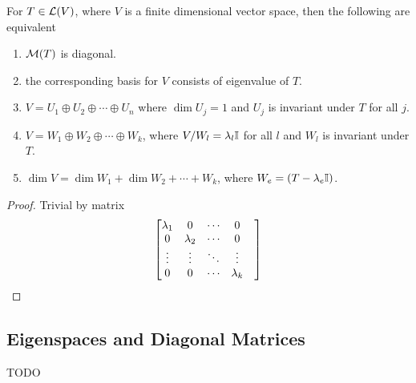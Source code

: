 \begin{theorem}
    For $T \in \mathcal L(V)$, where $V$ is a finite dimensional vector space, then the following are equivalent
    \begin{enumerate}
        \item $\mathcal M(T)$ is diagonal.
        \item the corresponding basis for $V$ consists of eigenvalue of $T$.
        \item $V = U_1 \oplus U_2 \oplus \cdots \oplus U_n$ where $\dim U_j = 1$ and $U_j$ is invariant under $T$ for all $j$.
        \item $V = W_1 \oplus W_2 \oplus \cdots \oplus W_k$, where $V/W_l = \lambda_l \mathbb I$ for all $l$ and $W_l$ is invariant under $T$.
        \item $\dim V = \dim W_1 + \dim W_2 + \cdots + W_k$, where $W_e = \null (T - \lambda_e \b I)$.
    \end{enumerate}
\end{theorem}

\begin{proof}
Trivial by matrix
    \[ \begin{bmatrix} \lambda_1 & 0 & \cdots & 0 & \\
0 & \lambda_2 & \cdots & 0 & \\
\vdots & \vdots & \ddots & \vdots & \\
0 & 0 & \cdots & \lambda_k & \\ \end{bmatrix}\]
\end{proof}
\subsection{Eigenspaces and Diagonal Matrices}
{\huge TODO}








